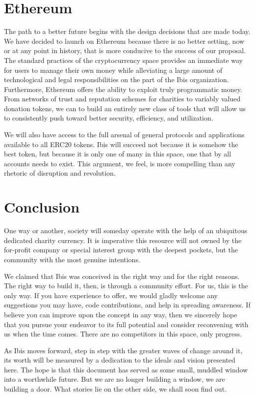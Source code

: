 \documentclass{article} \usepackage{parskip}
\begin{document}
\section{Ethereum}

The path to a better future begins with the design decisions that are made
today. We have decided to launch on Ethereum because there is no better setting,
now or at any point in history, that is more conducive to the success of our
proposal. The standard practices of the cryptocurrency space provides an
immediate way for users to manage their own money while alleviating a large
amount of technological and legal responsibilities on the part of the Ibis
organization. Furthermore, Ethereum offers the ability to exploit truly
programmatic money. From networks of trust and reputation schemes for charities
to variably valued donation tokens, we can to build an entirely new class of
tools that will allow us to consistently push toward better security,
efficiency, and utilization.

We will also have access to the full arsenal of general protocols and
applications available to all ERC20 tokens. Ibis will succeed not because it is
somehow the best token, but because it is only one of many in this space, one
that by all accounts needs to exist. This argument, we feel, is more compelling
than any rhetoric of disruption and revolution.

\section{Conclusion}

One way or another, society will someday operate with the help of an ubiquitous
dedicated charity currency. It is imperative this resource will not owned by the
for-profit company or special interest group with the deepest pockets, but the
community with the most genuine intentions.

We claimed that Ibis was conceived in the right way and for the right
reasons. The right way to build it, then, is through a community effort. For us,
this is the only way. If you have experience to offer, we would gladly welcome
any suggestions you may have, code contributions, and help in spreading
awareness. If believe you can improve upon the concept in any way, then we
sincerely hope that you pursue your endeavor to its full potential and consider
reconvening with us when the time comes. There are no competitors in this
space, only progress.

As Ibis moves forward, step in step with the greater waves of change around it,
its worth will be measured by a dedication to the ideals and vision presented
here. The hope is that this document has served as some small, muddled window
into a worthwhile future. But we are no longer building a window, we are
building a door. What stories lie on the other side, we shall soon find out.
\end{document}
